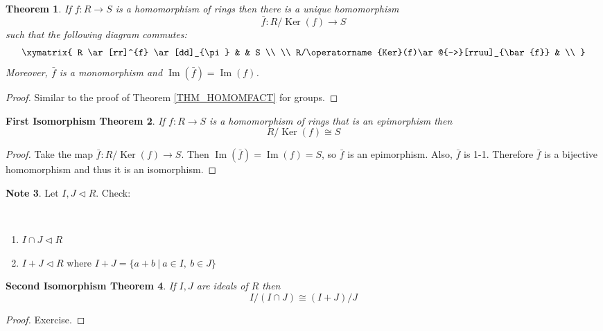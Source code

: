 \documentclass[12pt, letterpaper, oneside]{article}
\theoremstyle{plain}
\newtheorem{theorem}{Theorem}[section]
\newtheorem{FIT}[theorem]{First Isomorphism Theorem}
\newtheorem{SIT}[theorem]{Second Isomorphism Theorem}
\theoremstyle{definition}
\newtheorem{note}[theorem]{Note}
\renewcommand{\Im}{\operatorname{Im}}
\newcommand{\Ker}{\operatorname{Ker}}
\newcommand{\benu}{\begin{enumerate}}
\newcommand{\eenu}{\end{enumerate}}
\newcommand{\vs}{\vskip 5mm}
\begin{document}
\vs

\begin{theorem}
\label{THM_HOMOMFACTRING}
If $f\colon R\to S$ is a homomorphism of rings then there is a unique  homomorphism 
$$\bar{f}\colon R/\Ker(f) \to S$$
such that the following diagram commutes:
$$
\xymatrix{
R \ar[rr]^{f} \ar[dd]_{\pi} & & S \\
\\
R/\Ker(f)\ar@{-->}[rruu]_{\bar{f}} & \\
}
$$
Moreover, $\bar{f}$ is a monomorphism and $\Im(\bar{f})= \Im(f)$. 
\end{theorem}

\vs 

\begin{proof}
Similar to the proof of Theorem \ref{THM_HOMOMFACT} for groups. 
\end{proof}


\vs\vs

\begin{FIT}
\label{THM_FITRING}
If $f\colon R\to S$ is a homomorphism of rings that is an epimorphism then 
$$R/\Ker(f) \cong S$$
\end{FIT}

\vs

\begin{proof}
Take the map $\bar{f}\colon R/\Ker(f) \to S$. Then $\Im(\bar{f})= \Im(f) = S$, so $\bar{f}$ is 
an epimorphism. Also, $\bar{f}$ is 1-1. Therefore $\bar{f}$ is a bijective homomorphism 
and thus it is an isomorphism. 
\end{proof}

\vs\vs

\begin{note} Let $I, J\lhd R$. Check: 

\vskip -13mm

\ 
\benu
\item $I\cap J \lhd R$
\item $I+J \lhd R$ where $I+J = \{ a+b \ | \ a\in I, \ b\in J\}$
\eenu
\end{note}


\vs\vs

\begin{SIT}
If $I, J$ are ideals of $R$ then
$$I/(I\cap J) \cong (I+J)/J$$
\end{SIT}


\begin{proof}
Exercise.
\end{proof}

\vs\vs
\end{document}

